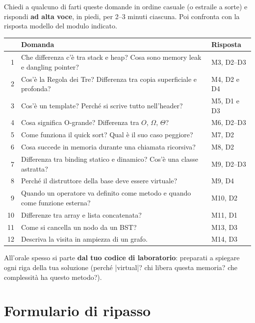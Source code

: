 Chiedi a qualcuno di farti queste domande in ordine casuale (o estraile a sorte) e
rispondi \textbf{ad alta voce}, in piedi, per 2--3 minuti ciascuna. Poi confronta con la
risposta modello del modulo indicato.
\begin{center}\small
\begin{tabular}{rp{10.4cm}l}
\toprule
 & \textbf{Domanda} & \textbf{Risposta} \\
\midrule
1  & Che differenza c'è tra stack e heap? Cosa sono memory leak e dangling pointer? & M3, D2--D3 \\
2  & Cos'è la Regola dei Tre? Differenza tra copia superficiale e profonda?       & M4, D2 e D4 \\
3  & Cos'è un template? Perché si scrive tutto nell'header?                       & M5, D1 e D3 \\
4  & Cosa significa O-grande? Differenza tra $O$, $\Omega$, $\Theta$?             & M6, D2--D3 \\
5  & Come funziona il quick sort? Qual è il suo caso peggiore?                    & M7, D2 \\
6  & Cosa succede in memoria durante una chiamata ricorsiva?                      & M8, D2 \\
7  & Differenza tra binding statico e dinamico? Cos'è una classe astratta?        & M9, D2--D3 \\
8  & Perché il distruttore della base deve essere virtuale?                       & M9, D4 \\
9  & Quando un operatore va definito come metodo e quando come funzione esterna?  & M10, D2 \\
10 & Differenze tra array e lista concatenata?                                    & M11, D1 \\
11 & Come si cancella un nodo da un BST?                                           & M13, D3 \\
12 & Descriva la visita in ampiezza di un grafo.                                   & M14, D3 \\
\bottomrule
\end{tabular}
\end{center}
All'orale spesso si parte \textbf{dal tuo codice di laboratorio}: preparati a spiegare ogni
riga della tua soluzione (perché \cc|virtual|? chi libera questa memoria? che complessità
ha questo metodo?).

\section{Formulario di ripasso}

